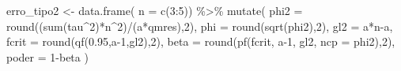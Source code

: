 \documentclass[
]{article}
\newenvironment{Shaded}{\begin{snugshade}}{\end{snugshade}}
\newcommand{\AttributeTok}[1]{\textcolor[rgb]{0.77,0.63,0.00}{#1}}
\newcommand{\DecValTok}[1]{\textcolor[rgb]{0.00,0.00,0.81}{#1}}
\newcommand{\FloatTok}[1]{\textcolor[rgb]{0.00,0.00,0.81}{#1}}
\newcommand{\FunctionTok}[1]{\textcolor[rgb]{0.00,0.00,0.00}{#1}}
\newcommand{\NormalTok}[1]{#1}
\newcommand{\OtherTok}[1]{\textcolor[rgb]{0.56,0.35,0.01}{#1}}
\newcommand{\SpecialCharTok}[1]{\textcolor[rgb]{0.00,0.00,0.00}{#1}}
\begin{document}
\begin{Shaded}
\begin{Highlighting}[]
\NormalTok{erro\_tipo2 }\OtherTok{\textless{}{-}} \FunctionTok{data.frame}\NormalTok{(}
  \AttributeTok{n =} \FunctionTok{c}\NormalTok{(}\DecValTok{3}\SpecialCharTok{:}\DecValTok{5}\NormalTok{)) }\SpecialCharTok{\%\textgreater{}\%}
  \FunctionTok{mutate}\NormalTok{(}
    \AttributeTok{phi2 =} \FunctionTok{round}\NormalTok{((}\FunctionTok{sum}\NormalTok{(tau}\SpecialCharTok{\^{}}\DecValTok{2}\NormalTok{)}\SpecialCharTok{*}\NormalTok{n}\SpecialCharTok{\^{}}\DecValTok{2}\NormalTok{)}\SpecialCharTok{/}\NormalTok{(a}\SpecialCharTok{*}\NormalTok{qmres),}\DecValTok{2}\NormalTok{),}
    \AttributeTok{phi =} \FunctionTok{round}\NormalTok{(}\FunctionTok{sqrt}\NormalTok{(phi2),}\DecValTok{2}\NormalTok{),}
    \AttributeTok{gl2 =}\NormalTok{ a}\SpecialCharTok{*}\NormalTok{n}\SpecialCharTok{{-}}\NormalTok{a,}
    \AttributeTok{fcrit =} \FunctionTok{round}\NormalTok{(}\FunctionTok{qf}\NormalTok{(}\FloatTok{0.95}\NormalTok{,a}\DecValTok{{-}1}\NormalTok{,gl2),}\DecValTok{2}\NormalTok{),}
    \AttributeTok{beta =} \FunctionTok{round}\NormalTok{(}\FunctionTok{pf}\NormalTok{(fcrit, a}\DecValTok{{-}1}\NormalTok{, gl2, }\AttributeTok{ncp =}\NormalTok{ phi2),}\DecValTok{2}\NormalTok{),}
    \AttributeTok{poder =} \DecValTok{1}\SpecialCharTok{{-}}\NormalTok{beta}
\NormalTok{    )}
\end{Highlighting}
\end{Shaded}
\end{document}
